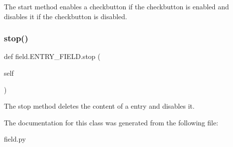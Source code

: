 The start method enables a checkbutton if the checkbutton is enabled and disables it if the checkbutton is disabled. 

\mbox{\label{classfield_1_1ENTRY__FIELD_ad87b69becbcd6dd90bd3854e53a72195}} 
\subsubsection{\texorpdfstring{stop()}{stop()}}
{\footnotesize\ttfamily def field.\+E\+N\+T\+R\+Y\+\_\+\+F\+I\+E\+L\+D.\+stop (\begin{DoxyParamCaption}\item[{}]{self }\end{DoxyParamCaption})}



The stop method deletes the content of a entry and disables it. 



The documentation for this class was generated from the following file\+:\begin{DoxyCompactItemize}
\item 
field.\+py\end{DoxyCompactItemize}
